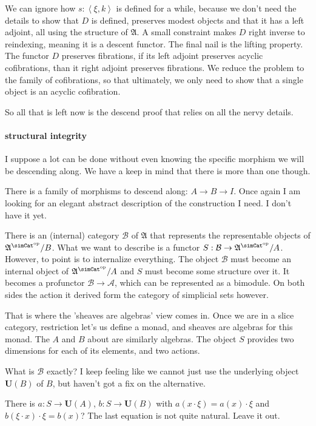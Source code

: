 \documentclass{tac}
\newcommand\cat\mathcal
\newcommand\dual{^{\mathrm{op}}}
\newcommand\s{^{\simCat\dual}}
\newcommand\of{:}
\newcommand\tuplet[1]{\left\langle #1 \right\rangle}
\newcommand\base{\mathbf{U}}
\newcommand\ambient{\mathfrak A}
\begin{document}
We can ignore how $s\of\tuplet{\xi,k}$ is defined for a while, because we don't need the details to show that $D$ is defined, preserves modest objects and that it has a left adjoint, all using the structure of $\ambient$. A small constraint makes $D$ right inverse to reindexing, meaning it is a descent functor. The final nail is the lifting property. The functor $D$ preserves fibrations, if its left adjoint preserves acyclic cofibrations, than it right adjoint preserves fibrations. We reduce the problem to the family of cofibrations, so that ultimately, we only need to show that a single object is an acyclic cofibration.

So all that is left now is the descend proof that relies on all the nervy details. 

\paragraph{structural integrity}
I suppose a lot can be done without even knowing the specific morphism we will be descending along. We have a keep in mind that there is more than one though.

There is a family of morphisms to descend along: $A\to B\to I$. Once again I am looking for an elegant abstract description of the construction I need.
I don't have it yet.

There is an (internal) category $\cat B$ of $\ambient$ that represents the representable objects of $\ambient\s/B$. What we want to describe is a functor $S:\cat B\to \ambient\s/A$. However, to point is to internalize everything. The object $\cat B$ must become an internal object of $\ambient\s/A$ and $S$ must become some structure over it. It becomes a profunctor $\cat B \to \cat A$, which can be represented as a bimodule. On both sides the action it derived form the category of simplicial sets however.

That is where the 'sheaves are algebras' view comes in. Once we are in a slice category, restriction let's us define a monad, and sheaves are algebras for this monad. The $A$ and $B$ about are similarly algebras. The object $S$ provides two dimensions for each of its elements, and two actions. 

What is $\cat B$ exactly? I keep feeling like we cannot just use the underlying object $\base(B)$ of $B$, but haven't got a fix on the alternative.

There is $a\of S\to \base(A)$, $b\of S\to \base (B)$ with $a(x\cdot\xi) = a(x)\cdot\xi$ and $b(\xi\cdot x)\cdot \xi = b(x)$? The last equation is not quite natural. Leave it out.
\end{document}
